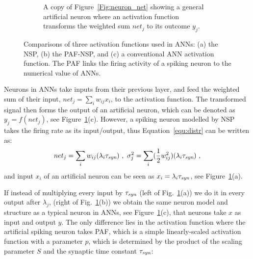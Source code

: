 \begin{figure}[tbh!]
\begin{subfigure}[t]{\textwidth}
			\caption{A copy of Figure~\ref{Fig:neuron_net} showing a general artificial neuron where an activation function transforms the weighted sum $net_j$  to its outcome $y_j$.}
		\end{subfigure}
		\DIFdelbeginFL %
\DIFdelendFL \DIFaddbeginFL \caption[Comparisons of three activation functions]{\DIFaddendFL Comparisons of three activation functions used in ANNs: (a) the NSP, (b) the PAF-NSP, and (c) a conventional ANN activation function. The PAF links the firing activity of a spiking neuron to the numerical value of ANNs.}
		\label{Fig:tneuron}
	\end{figure}

	Neurons in ANNs take inputs from their previous layer, and feed the weighted sum of their input, $net_j = \sum_i w_{ij}x_i$, to the activation function.
	The transformed signal then forms the output of an artificial neuron, which can be denoted as $y_j=f(net_j)$, see Figure~\ref{Fig:tneuron}(c).
	However, a spiking neuron modelled by NSP takes the firing rate as its input/output, thus Equation~\ref{equ:distr} can be written as:
	\begin{equation}
	net_j = \sum_i w_{ij}(\lambda_{i}\tau_{\textit{\textrm{syn}}})~,
	~\sigma^2_j= \sum_i (\frac{1}{2} w_{ij}^2)(\lambda_{i}\tau_{\textit{\textrm{syn}}})~, 
	\label{equ:mi_input}
	\end{equation}
	and input $ x_i $ of an artificial neuron can be seen as $x_i=\lambda_{i}\tau_{\textit{\textrm{syn}}}$, see Figure~\ref{Fig:tneuron}(a).

	
	If instead of multiplying every input by $\tau_{\textit{\textrm{syn}}}$ (left of Fig.~\ref{Fig:tneuron}(a)) we do it in every output after $\lambda_j$, (right of Fig.~\ref{Fig:tneuron}(b)) we obtain the same neuron model and structure as a typical neuron in ANNs, see Figure~\ref{Fig:tneuron}(c), that neurons take $x$ as input and output $y$.
	The only difference lies in the activation function where the artificial spiking neuron takes PAF, which is a simple linearly-scaled activation function with a parameter $p$, which is determined by the product of the scaling parameter $S$ and the synaptic time constant $\tau_{\textit{\textrm{syn}}}$:

